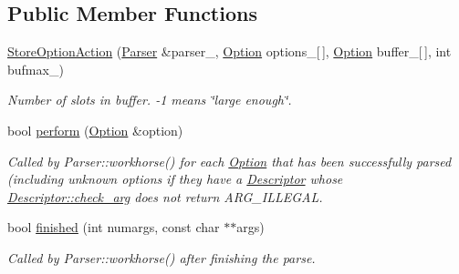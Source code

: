 \subsection*{Public Member Functions}
\begin{DoxyCompactItemize}
\item 
\hyperlink{classxmem_1_1config_1_1third__party_1_1_parser_1_1_store_option_action_aa6e4863f12c3f40b38d1571e75066aa4}{Store\-Option\-Action} (\hyperlink{classxmem_1_1config_1_1third__party_1_1_parser}{Parser} \&parser\-\_\-, \hyperlink{classxmem_1_1config_1_1third__party_1_1_option}{Option} options\-\_\-\mbox{[}$\,$\mbox{]}, \hyperlink{classxmem_1_1config_1_1third__party_1_1_option}{Option} buffer\-\_\-\mbox{[}$\,$\mbox{]}, int bufmax\-\_\-)
\begin{DoxyCompactList}\small\item\em Number of slots in {\ttfamily buffer}. {\ttfamily -\/1} means \char`\"{}large enough\char`\"{}. \end{DoxyCompactList}\item 
bool \hyperlink{classxmem_1_1config_1_1third__party_1_1_parser_1_1_store_option_action_ab34c68452366b58ad4163602cf5f435d}{perform} (\hyperlink{classxmem_1_1config_1_1third__party_1_1_option}{Option} \&option)
\begin{DoxyCompactList}\small\item\em Called by Parser\-::workhorse() for each \hyperlink{classxmem_1_1config_1_1third__party_1_1_option}{Option} that has been successfully parsed (including unknown options if they have a \hyperlink{structxmem_1_1config_1_1third__party_1_1_descriptor}{Descriptor} whose \hyperlink{structxmem_1_1config_1_1third__party_1_1_descriptor_a65b39f8d61de820bb5001d590e7dea5d}{Descriptor\-::check\-\_\-arg} does not return A\-R\-G\-\_\-\-I\-L\-L\-E\-G\-A\-L. \end{DoxyCompactList}\item 
bool \hyperlink{classxmem_1_1config_1_1third__party_1_1_parser_1_1_store_option_action_ad4e098cce0b0f97f025aec65d6226dff}{finished} (int numargs, const char $\ast$$\ast$args)
\begin{DoxyCompactList}\small\item\em Called by Parser\-::workhorse() after finishing the parse. \end{DoxyCompactList}\end{DoxyCompactItemize}


